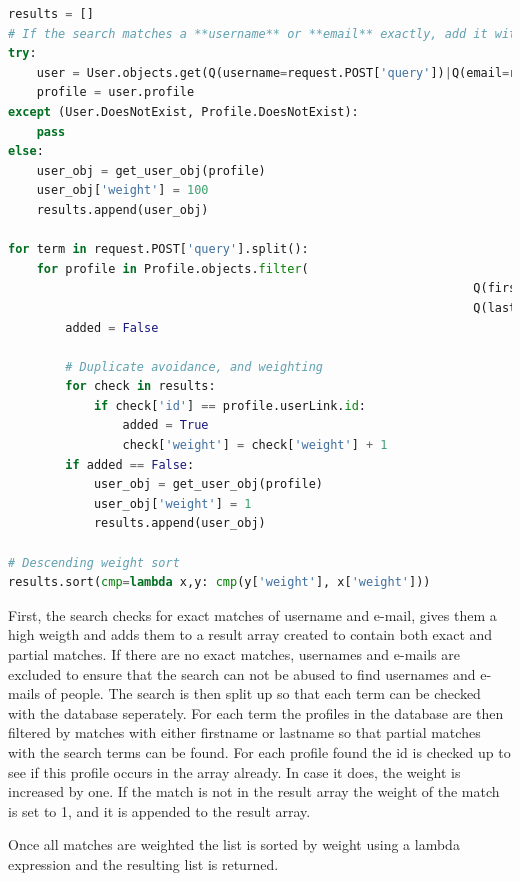 \begin{lstlisting}[language=Python,caption=Weighting of the search results]
results = []
# If the search matches a **username** or **email** exactly, add it with high weight, else exclude usernames
try:
	user = User.objects.get(Q(username=request.POST['query'])|Q(email=request.POST['query']))
	profile = user.profile
except (User.DoesNotExist, Profile.DoesNotExist):
	pass
else:
	user_obj = get_user_obj(profile)
	user_obj['weight'] = 100
	results.append(user_obj)

for term in request.POST['query'].split():
	for profile in Profile.objects.filter(
																 Q(firstname__icontains=term)|
																 Q(lastname__icontains=term)):
		added = False
		
		# Duplicate avoidance, and weighting
		for check in results:
			if check['id'] == profile.userLink.id:
				added = True
				check['weight'] = check['weight'] + 1
		if added == False:
			user_obj = get_user_obj(profile)
			user_obj['weight'] = 1
			results.append(user_obj)
					
# Descending weight sort
results.sort(cmp=lambda x,y: cmp(y['weight'], x['weight'])) 
\end{lstlisting}

First, the search checks for exact matches of username and e-mail, gives them a high weigth and adds them to a result array created to contain both exact and partial matches. If there are no exact matches, usernames and e-mails are excluded to ensure that the search can not be abused to find usernames and e-mails of people.
The search is then split up so that each term can be checked with the database seperately. For each term the profiles in the database are then filtered by matches with either firstname or lastname so that partial matches with the search terms can be found. For each profile found the id is checked up to see if this profile occurs in the array already. In case it does, the weight is increased by one. If the match is not in the result array the weight of the match is set to 1, and it is appended to the result array.

Once all matches are weighted the list is sorted by weight using a lambda expression and the resulting list is returned. 